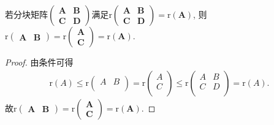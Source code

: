 \documentclass[../../main.tex]{subfiles}
\begin{document}
\begin{proposition}\label{proposition:列分块与行分块秩等于其交叉块的秩}
若分块矩阵\(\begin{pmatrix}
\boldsymbol{A}&\boldsymbol{B}\\
\boldsymbol{C}&\boldsymbol{D}
\end{pmatrix}\)满足\(\mathrm{r}\begin{pmatrix}
\boldsymbol{A}&\boldsymbol{B}\\
\boldsymbol{C}&\boldsymbol{D}
\end{pmatrix}=\mathrm{r}(\boldsymbol{A})\), 则\(\mathrm{r}\begin{pmatrix}
\boldsymbol{A}&\boldsymbol{B}
\end{pmatrix}=\mathrm{r}\begin{pmatrix}
\boldsymbol{A}\\
\boldsymbol{C}
\end{pmatrix}=\mathrm{r}(\boldsymbol{A})\).
\end{proposition}
\begin{proof}
由条件可得
\begin{align*}
\mathrm{r}\left( A \right) \leqslant \mathrm{r}\left( \begin{matrix}
A&		B\\
\end{matrix} \right) =\mathrm{r}\left( \begin{array}{c}
A\\
C\\
\end{array} \right) \leqslant \mathrm{r}\left( \begin{matrix}
A&		B\\
C&		D\\
\end{matrix} \right) =\mathrm{r}\left( A \right) .
\end{align*}
故\(\mathrm{r}\begin{pmatrix}
\boldsymbol{A}&\boldsymbol{B}
\end{pmatrix}=\mathrm{r}\begin{pmatrix}
\boldsymbol{A}\\
\boldsymbol{C}
\end{pmatrix}=\mathrm{r}(\boldsymbol{A})\).
\end{proof}
\end{document}
